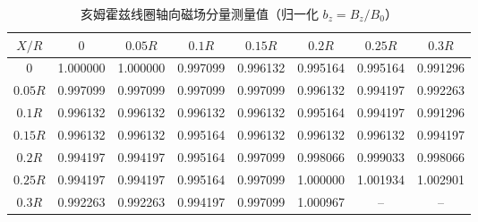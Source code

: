 \documentclass[11pt]{ctexart}
\makeatletter
\newcommand{\boxspacing}{\kern\kvtcb@left@rule\kern\kvtcb@boxsep}
\newcommand{\prompt}[4]{
        {\ttfamily\llap{{\color{#2}[#3]:\hspace{3pt}#4}}\vspace{-\baselineskip}}
    }
\makeatother
\begin{document}
            \begin{tcolorbox}[breakable, size=fbox, boxrule=.5pt, pad at break*=1mm, opacityfill=0]
\prompt{Out}{outcolor}{12}{\boxspacing}
\begin{table}[H]
\centering
\caption{亥姆霍兹线圈轴向磁场分量测量值（归一化 $b_z = B_z/B_0$）}
\label{tab:measure}
\begin{tabular}{c|ccccccc}
\toprule
$X/R$ & $0$ & $0.05R$ & $0.1R$ & $0.15R$ & $0.2R$ & $0.25R$ & $0.3R$ \\
\midrule
$0$     & 1.000000 & 1.000000 & 0.997099 & 0.996132 & 0.995164 & 0.995164 & 0.991296 \\
$0.05R$ & 0.997099 & 0.997099 & 0.997099 & 0.997099 & 0.996132 & 0.994197 & 0.992263 \\
$0.1R$  & 0.996132 & 0.996132 & 0.996132 & 0.996132 & 0.995164 & 0.994197 & 0.991296 \\
$0.15R$ & 0.996132 & 0.996132 & 0.995164 & 0.996132 & 0.996132 & 0.996132 & 0.994197 \\
$0.2R$  & 0.994197 & 0.994197 & 0.995164 & 0.997099 & 0.998066 & 0.999033 & 0.998066 \\
$0.25R$ & 0.994197 & 0.994197 & 0.995164 & 0.997099 & 1.000000 & 1.001934 & 1.002901 \\
$0.3R$  & 0.992263 & 0.992263 & 0.994197 & 0.997099 & 1.000967 & --       & -- \\
\bottomrule
\end{tabular}
\end{table}
\end{tcolorbox}
        
\end{document}
